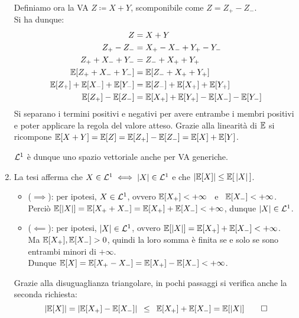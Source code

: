 \begin{dimo}
\begin{enumerate}
  Definiamo ora la VA $Z \coloneqq X + Y$, scomponibile come $Z = Z_+ - Z_-$. \\
  Si ha dunque:
  \begin{align*}
    Z &= X + Y \\
    Z_+ - Z_- &= X_+ - X_- + Y_+ - Y_- \\
    Z_+ + X_- + Y_- &= Z_- + X_+ + Y_+ \\
    \mathbb E[Z_+ + X_- + Y_-] &= \mathbb E[Z_- + X_+ + Y_+] \\
    \mathbb E[Z_+] + \mathbb E[X_-] + \mathbb E[Y_-] &= \mathbb E[Z_-] + \mathbb E[X_+] + \mathbb E[Y_+]\\
    \mathbb E[Z_+] - \mathbb E[Z_-]  &= \mathbb E[X_+] + \mathbb E[Y_+] - \mathbb E[X_-] - \mathbb E[Y_-]
  \end{align*}
  Si separano i termini positivi e negativi per avere entrambe i membri positivi e poter applicare la regola del valore atteso. Grazie alla linearità di $\mathbb E$ si ricompone $\mathbb E[X+Y] = \mathbb E[Z] = \mathbb E[Z_+] - \mathbb E[Z_-] = \mathbb E[X] + \mathbb E[Y]$.

  $\mathcal L^1$ è dunque uno spazio vettoriale anche per VA generiche.
  \item La tesi afferma che $X \in \mathcal L^1 \iff \lvert X\rvert \in \mathcal L^1$ e che $\lvert\mathbb E[X]\rvert \le \mathbb E[\, \lvert X\rvert \,]$.
  \begin{itemize}
    \item ($\implies$): per ipotesi, $X \in \mathcal L^1$, ovvero
      $\mathbb E[X_+] < +\infty\enspace$ e $\enspace\mathbb E[X_-] < +\infty$. \\
      Perciò $\mathbb E[|X|] = \mathbb E[X_+ + X_-]
        = \mathbb E[X_+] + \mathbb E[X_-] < +\infty$,
      dunque $|X| \in \mathcal L^1$.

    \item ($\impliedby$): per ipotesi, $\lvert X\rvert \in \mathcal L^1$, ovvero
      $\mathbb E[\lvert X\rvert] = \mathbb E[X_+] + \mathbb E[X_-] < +\infty$. \\
      Ma $\mathbb E[X_+], \mathbb E[X_-] > 0$, quindi la loro somma è finita se
      e solo se sono entrambi minori di $+\infty$. \\
      Dunque $\mathbb E[X] = \mathbb E[X_+ - X_-]
        = \mathbb E[X_+] - \mathbb E[X_-] < +\infty$.
  \end{itemize}
	Grazie alla disuguaglianza triangolare, in pochi passaggi si verifica anche la seconda richiesta:
	$$|\mathbb E[X]| = |\mathbb E[X_+] - \mathbb E[X_-]|
	\enspace\le\enspace \mathbb E[X_+] + \mathbb E[X_-] = \mathbb E[\lvert X\rvert] \qedhere$$
  \end{enumerate}
\end{dimo}

\medskip



